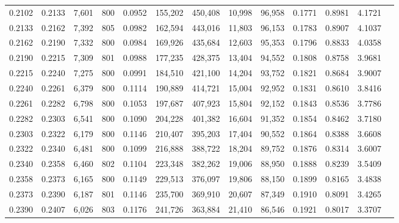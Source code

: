 \begin{tabular}{rrrrrrrrrrrrr}
0.2102 & 0.2133 &  7,601 & 800 &                                     0.0952 & 155,202 & 450,408 &  10,998 &  96,958 & 0.1771 & 0.8981 & 4.1721 \\
0.2133 & 0.2162 &  7,392 & 805 &                                     0.0982 & 162,594 & 443,016 &  11,803 &  96,153 & 0.1783 & 0.8907 & 4.1037 \\
0.2162 & 0.2190 &  7,332 & 800 &                                     0.0984 & 169,926 & 435,684 &  12,603 &  95,353 & 0.1796 & 0.8833 & 4.0358 \\
0.2190 & 0.2215 &  7,309 & 801 &                                     0.0988 & 177,235 & 428,375 &  13,404 &  94,552 & 0.1808 & 0.8758 & 3.9681 \\
0.2215 & 0.2240 &  7,275 & 800 &                                     0.0991 & 184,510 & 421,100 &  14,204 &  93,752 & 0.1821 & 0.8684 & 3.9007 \\
0.2240 & 0.2261 &  6,379 & 800 &                                     0.1114 & 190,889 & 414,721 &  15,004 &  92,952 & 0.1831 & 0.8610 & 3.8416 \\
0.2261 & 0.2282 &  6,798 & 800 &                                     0.1053 & 197,687 & 407,923 &  15,804 &  92,152 & 0.1843 & 0.8536 & 3.7786 \\
0.2282 & 0.2303 &  6,541 & 800 &                                     0.1090 & 204,228 & 401,382 &  16,604 &  91,352 & 0.1854 & 0.8462 & 3.7180 \\
0.2303 & 0.2322 &  6,179 & 800 &                                     0.1146 & 210,407 & 395,203 &  17,404 &  90,552 & 0.1864 & 0.8388 & 3.6608 \\
0.2322 & 0.2340 &  6,481 & 800 &                                     0.1099 & 216,888 & 388,722 &  18,204 &  89,752 & 0.1876 & 0.8314 & 3.6007 \\
0.2340 & 0.2358 &  6,460 & 802 &                                     0.1104 & 223,348 & 382,262 &  19,006 &  88,950 & 0.1888 & 0.8239 & 3.5409 \\
0.2358 & 0.2373 &  6,165 & 800 &                                     0.1149 & 229,513 & 376,097 &  19,806 &  88,150 & 0.1899 & 0.8165 & 3.4838 \\
0.2373 & 0.2390 &  6,187 & 801 &                                     0.1146 & 235,700 & 369,910 &  20,607 &  87,349 & 0.1910 & 0.8091 & 3.4265 \\
0.2390 & 0.2407 &  6,026 & 803 &                                     0.1176 & 241,726 & 363,884 &  21,410 &  86,546 & 0.1921 & 0.8017 & 3.3707 \\

\end{tabular}
